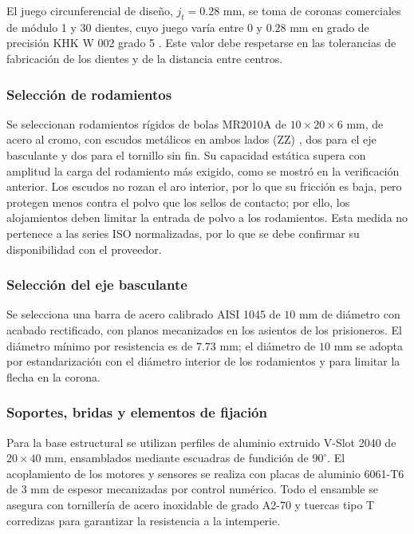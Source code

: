 \documentclass[../../General.tex]{subfiles}
\begin{document}
El juego circunferencial de diseño, $j_t = 0.28\text{ mm}$, se toma de coronas comerciales de módulo 1 y 30 dientes, cuyo juego varía entre $0$ y $0.28\text{ mm}$ en grado de precisión KHK W 002 grado 5 \citep{khk_pg1_30r1j8}. Este valor debe respetarse en las tolerancias de fabricación de los dientes y de la distancia entre centros.

\subsubsection{Selección de rodamientos}

Se seleccionan rodamientos rígidos de bolas MR2010A de $10\times20\times6\text{ mm}$, de acero al cromo, con escudos metálicos en ambos lados (ZZ) \citep{mr2010a_bearing}, dos para el eje basculante y dos para el tornillo sin fin. Su capacidad estática supera con amplitud la carga del rodamiento más exigido, como se mostró en la verificación anterior. Los escudos no rozan el aro interior, por lo que su fricción es baja, pero protegen menos contra el polvo que los sellos de contacto; por ello, los alojamientos deben limitar la entrada de polvo a los rodamientos. Esta medida no pertenece a las series ISO normalizadas, por lo que se debe confirmar su disponibilidad con el proveedor.

\subsubsection{Selección del eje basculante}

Se selecciona una barra de acero calibrado AISI 1045 de $10\text{ mm}$ de diámetro con acabado rectificado, con planos mecanizados en los asientos de los prisioneros. El diámetro mínimo por resistencia es de $7.73\text{ mm}$; el diámetro de $10\text{ mm}$ se adopta por estandarización con el diámetro interior de los rodamientos y para limitar la flecha en la corona.

\subsubsection{Soportes, bridas y elementos de fijación}

Para la base estructural se utilizan perfiles de aluminio extruido V-Slot 2040 de $20\times40\text{ mm}$, ensamblados mediante escuadras de fundición de $90^\circ$. El acoplamiento de los motores y sensores se realiza con placas de aluminio 6061-T6 de $3\text{ mm}$ de espesor mecanizadas por control numérico. Todo el ensamble se asegura con tornillería de acero inoxidable de grado A2-70 y tuercas tipo T corredizas para garantizar la resistencia a la intemperie.
\end{document}
